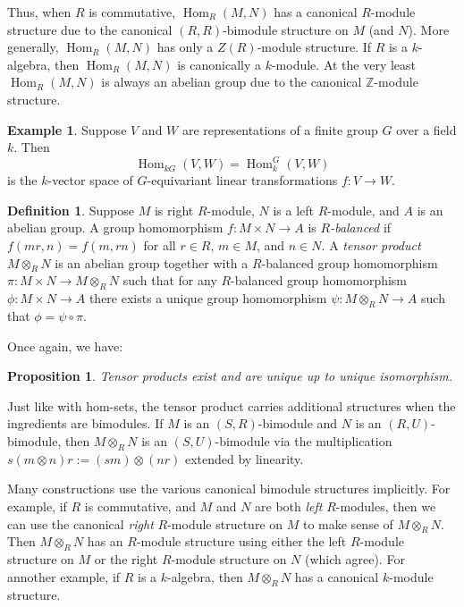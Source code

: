 \documentclass[12pt]{article}
\theoremstyle{plain}
\newtheorem{proposition}[theorem]{Proposition}
\theoremstyle{definition}
\newtheorem{definition}[theorem]{Definition}
\newtheorem{example}[theorem]{Example}
\theoremstyle{remark}
\numberwithin{equation}{section}
\begin{document}
Thus, when $R$ is commutative, $\operatorname{Hom}_R(M,N)$
has a canonical $R$-module structure due to the canonical
$(R,R)$-bimodule structure on $M$ (and $N$).
More generally, $\operatorname{Hom}_R(M,N)$ has only a $Z(R)$-module
structure.
If $R$ is a $k$-algebra, then $\operatorname{Hom}_R(M,N)$
is canonically a $k$-module.
At the very least $\operatorname{Hom}_R(M,N)$ is always an
abelian group due to the canonical $\mathbb{Z}$-module structure.

\begin{example}
Suppose $V$ and $W$ are representations of a finite group $G$
over a field $k$.
Then
\[
\operatorname{Hom}_{kG}(V,W) = \operatorname{Hom}^G_k(V,W)
\]
is the $k$-vector space of $G$-equivariant linear transformations
$f : V \to W$.
\end{example}

\begin{definition}
Suppose $M$ is right $R$-module, $N$ is a left $R$-module,
and $A$ is an abelian group.
A group homomorphism $f: M \times N \to A$ is \emph{$R$-balanced}
if $f(mr,n)=f(m,rn)$ for all $r \in R$, $m \in M$, and $n \in N$.
A \emph{tensor product} $M \otimes_R N$ is an abelian group
together with a $R$-balanced group homomorphism
$\pi : M \times N \to M \otimes_R N$ such that
for any $R$-balanced group homomorphism
$\phi : M \times N \to A$ there exists a unique
group homomorphism $\psi :  M \otimes_R N \to A$
such that $\phi = \psi \circ \pi$.
\end{definition}

Once again, we have:

\begin{proposition}
Tensor products exist and are unique up to unique isomorphism.
\end{proposition}

Just like with hom-sets, the tensor product carries additional
structures when the ingredients are bimodules.
If $M$ is an $(S,R)$-bimodule and $N$ is an $(R,U)$-bimodule,
then $M \otimes_R N$ is an $(S,U)$-bimodule via the multiplication
$s(m\otimes n)r := (sm) \otimes (nr)$ extended by linearity.

Many constructions use the various canonical bimodule structures
implicitly.
For example, if $R$ is commutative, and $M$ and $N$ are both
\emph{left} $R$-modules, then we can use the canonical
\emph{right} $R$-module structure on $M$
to make sense of $M \otimes_R N$.
Then $M \otimes_R N$ has an $R$-module structure using either the left
$R$-module structure on $M$ or the right $R$-module structure on $N$
(which agree).
For annother example, if $R$ is a $k$-algebra, then $M \otimes_R N$
has a canonical $k$-module structure.
\end{document}
